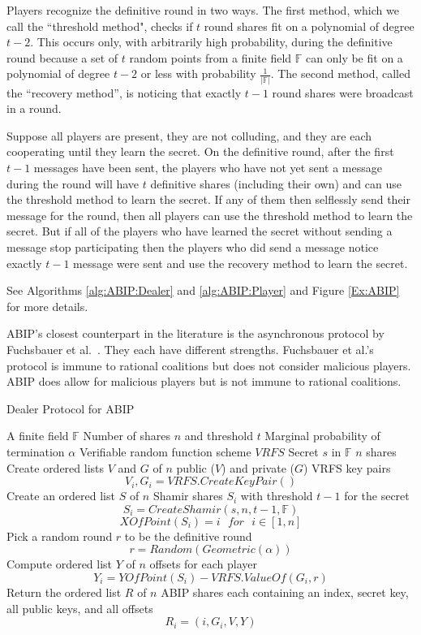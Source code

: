 \documentclass[12pt]{dalcsthesis}
\begin{document}
Players recognize the definitive round in two ways. The first method, which we call the ``threshold method", checks if $t$ round shares fit on a polynomial of degree $t-2$. This occurs only, with arbitrarily high probability, during the definitive round because a set of $t$ random points from a finite field $\mathbb{F}$ can only be fit on a polynomial of degree $t-2$ or less with probability $\frac{1}{|\mathbb{F}|}$. The second method, called the ``recovery method'', is noticing that exactly $t-1$ round shares were broadcast in a round.

Suppose all players are present, they are not colluding, and they are each cooperating until they learn the secret. On the definitive round, after the first $t-1$ messages have been sent, the players who have not yet sent a message during the round will have $t$ definitive shares (including their own) and can use the threshold method to learn the secret. If any of them then selflessly send their message for the round, then all players can use the threshold method to learn the secret. But if all of the players who have learned the secret without sending a message stop participating then the players who did send a message notice exactly $t-1$ message were sent and use the recovery method to learn the secret.

See Algorithms \ref{alg:ABIP:Dealer} and \ref{alg:ABIP:Player} and Figure \ref{Ex:ABIP} for more details.

ABIP's closest counterpart in the literature is the asynchronous protocol by Fuchsbauer et al.~\cite{fuch10}. They each have different strengths. Fuchsbauer et al.'s protocol is immune to rational coalitions but does not consider malicious players. ABIP does allow for malicious players but is not immune to rational coalitions.

\begin{algorithm}
  \caption{Dealer Protocol for ABIP}
  \label{alg:ABIP:Dealer}
  \begin{algorithmic}
    \INPUT A finite field $\mathbb{F}$
    \INPUT Number of shares $n$ and threshold $t$
    \INPUT Marginal probability of termination $\alpha$
    \INPUT Verifiable random function scheme $VRFS$
    \INPUT Secret $s$ in $\mathbb{F}$
    \OUTPUT $n$ shares
    \STATE Create ordered lists $V$ and $G$ of $n$ public ($V$) and private ($G$) VRFS key pairs
    	$$V_i, G_i = VRFS.CreateKeyPair()$$
    \STATE Create an ordered list $S$ of $n$ Shamir shares $S_i$ with threshold $t-1$ for the secret
    	$$S_i = CreateShamir(s, n, t - 1, \mathbb{F})$$
    	$$XOfPoint(S_i) = i \text{ } for \text{ } i \in [1, n]$$
    \STATE Pick a random round $r$ to be the definitive round
        $$r = Random(Geometric(\alpha))$$
    \STATE Compute ordered list $Y$ of $n$ offsets for each player
    	$$Y_i = YOfPoint(S_i) - VRFS.ValueOf(G_i, r)$$
    \STATE Return the ordered list $R$ of $n$ ABIP shares each containing an index, secret key, all public keys, and all offsets 
    	$$R_i = (i, G_i, V, Y)$$
  \end{algorithmic}
\end{algorithm}
\end{document}
